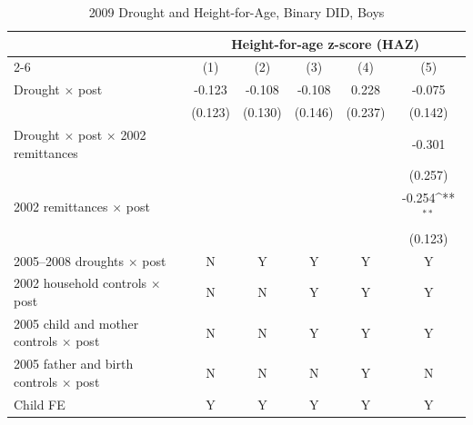 \documentclass[12pt]{article}
\def\sym#1{\ifmmode^{#1}\else\(^{#1}\)\fi}
\begin{document}
\begin{longtable}{l*{5}{c}}
\caption{2009 Drought and Height-for-Age, Binary DID, Boys}\\
\toprule
 & \multicolumn{5}{c}{Height-for-age z-score (HAZ)}\\
\cmidrule(lr){2-6}
            &\multicolumn{1}{c}{(1)}         &\multicolumn{1}{c}{(2)}         &\multicolumn{1}{c}{(3)}         &\multicolumn{1}{c}{(4)}         &\multicolumn{1}{c}{(5)}         \\
\midrule
Drought \ensuremath{\times} post&      -0.123         &      -0.108         &      -0.108         &       0.228         &      -0.075         \\
            &     (0.123)         &     (0.130)         &     (0.146)         &     (0.237)         &     (0.142)         \\
Drought \ensuremath{\times} post \ensuremath{\times} 2002 remittances&                     &                     &                     &                     &      -0.301         \\
            &                     &                     &                     &                     &     (0.257)         \\
2002 remittances \ensuremath{\times} post&                     &                     &                     &                     &      -0.254\sym{**} \\
            &                     &                     &                     &                     &     (0.123)         \\
\midrule
2005--2008 droughts \ensuremath{\times} post&           N         &           Y         &           Y         &           Y         &           Y         \\
2002 household controls \ensuremath{\times} post&           N         &           N         &           Y         &           Y         &           Y         \\
2005 child and mother controls \ensuremath{\times} post&           N         &           N         &           Y         &           Y         &           Y         \\
2005 father and birth controls \ensuremath{\times} post&           N         &           N         &           N         &           Y         &           N         \\
Child FE    &           Y         &           Y         &           Y         &           Y         &           Y         \\

\end{longtable}
\end{document}
